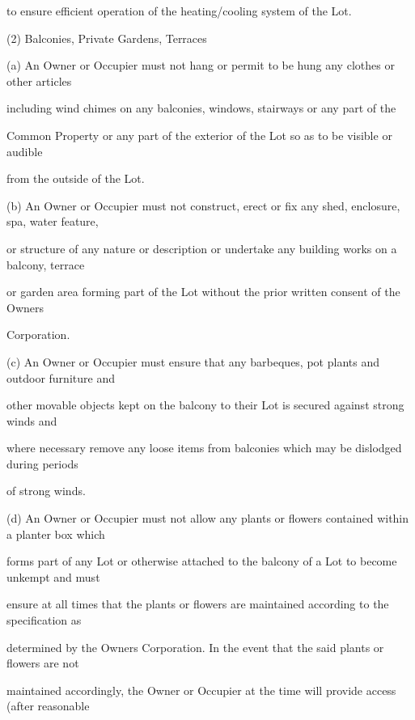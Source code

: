 \documentclass{article}
\begin{document}
{\fontsize{10.02}{1}to ensure efficient operation of the heating/cooling system of the Lot. }

{\fontsize{9.962}{1}(2) Balconies, Private Gardens, Terraces }

{\fontsize{9.962}{1}(a) An Owner or Occupier must not hang or permit to be hung any clothes or other articles }

{\fontsize{10.02}{1}including wind chimes on any balconies, windows, stairways or any part of the  }

{\fontsize{10.02}{1}Common Property or any part of the exterior of the Lot so as to be visible or audible }

{\fontsize{10.02}{1}from the outside of the Lot. }

{\fontsize{9.962}{1}(b) An Owner or Occupier must not construct, erect or fix any shed, enclosure, spa, water feature, }

{\fontsize{10.02}{1}or structure of any nature or description or undertake any building works on a balcony, terrace }

{\fontsize{10.02}{1}or garden area forming part of the Lot without the prior written consent of the Owners }

{\fontsize{10.02}{1}Corporation. }

{\fontsize{9.962}{1}(c) An Owner or Occupier must ensure that any barbeques, pot plants and outdoor furniture and }

{\fontsize{10.02}{1}other movable objects kept on the balcony to their Lot is secured against strong winds and }

{\fontsize{10.02}{1}where necessary remove any loose items from balconies which may be dislodged during periods }

{\fontsize{10.02}{1}of strong winds. }

{\fontsize{9.962}{1}(d) An Owner or Occupier must not allow any plants or flowers contained within a planter box which }

{\fontsize{10.02}{1}forms part of any Lot or otherwise attached to the balcony of a Lot to become unkempt and must }

{\fontsize{10.02}{1}ensure at all times that the plants or flowers are maintained according to the specification as }

{\fontsize{10.02}{1}determined by the Owners Corporation. In the event that the said plants or flowers are not }

{\fontsize{10.02}{1}maintained accordingly, the Owner or Occupier at the time will provide access (after reasonable }
\end{document}
